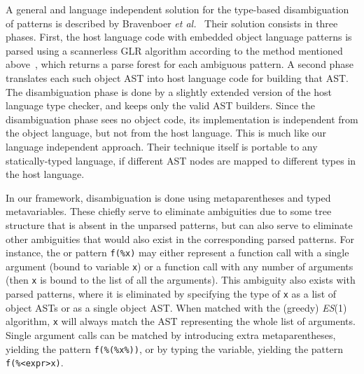 A general and language independent solution for the type\hyp{}based
disambiguation of patterns is described by Bravenboer \emph{et
  al.}~\cite{type-disambig} Their solution consists in three
phases. First, the host language code with embedded object language
patterns is parsed using a scannerless GLR algorithm according to the
method mentioned above~\cite{metaprog}, which returns a parse forest
for each ambiguous pattern. A second phase translates each such object
AST into host language code for building that AST. The disambiguation
phase is done by a slightly extended version of the host language type
checker, and keeps only the valid AST builders. Since the
disambiguation phase sees no object code, its implementation is
independent from the object language, but not from the host
language. This is much like our language independent approach. Their
technique itself is portable to any statically\hyp{}typed language, if
different AST nodes are mapped to different types in the host
language.

In our framework, disambiguation is done using meta\-parentheses and
typed meta\-variables. These chiefly serve to eliminate ambiguities
due to some tree structure that is absent in the unparsed patterns,
but can also serve to eliminate other ambiguities that would also
exist in the corresponding parsed patterns. For instance, the \Clang
or \Java pattern \texttt{f(\%x)} may either represent a function call
with a single argument (bound to variable \texttt{x}) or a function
call with any number of arguments (then \texttt{x} is bound to the
list of all the arguments). This ambiguity also exists with parsed
patterns, where it is eliminated by specifying the type of \texttt{x}
as a list of object ASTs or as a single object AST. When matched with
the (greedy) \textit{ES}(1) algorithm, \texttt{x} will always match
the AST representing the whole list of arguments.  Single argument
calls can be matched by introducing extra meta\-parentheses, yielding
the pattern \texttt{f(\%(\%x\%))}, or by typing the variable, yielding
the pattern \texttt{f(\%<expr>x)}.
